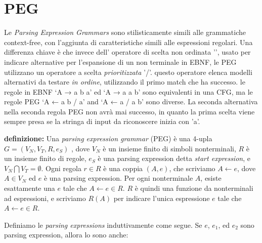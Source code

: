 \section{PEG} 
Le \textit{Parsing Expression Grammars}  \cite{brianford} sono stilisticamente simili alle grammatiche context-free, con l'aggiunta di  caratteristiche simili alle espressioni regolari. Una differenza chiave è che invece dell' operatore di scelta non ordinata '\textbar', usato per indicare alternative per l'espansione di un non terminale in EBNF, le PEG utilizzano un operatore a scelta \textit{prioritizzata} '/'. questo operatore elenca modelli alternativi da testare \textit{in ordine}, utilizzando il primo match che ha successo. le regole in EBNF ‘A → a b \textbar a’ ed ‘A → a \textbar a b’ sono equivalenti in una CFG, ma le regole PEG ‘A ← a b / a’ and ‘A ← a / a b’ sono diverse. La seconda alternativa nella seconda regola PEG non avrà mai successo, in quanto la prima scelta viene sempre presa se la stringa di input da riconoscere inizia con 'a'.

\textbf{definizione:} Una \textit{parsing expression grammar} (PEG) è una 4-upla $G = (V_N,V_T,R,e_S)$ , dove  $V_N$ è un insieme finito di simboli nonterminali, $R$ è un insieme finito di regole, $e_S$ è una parsing expression detta \textit{start expression}, e $V_N \bigcap V_T = \emptyset $. Ogni regola $r \in R$ è una coppia $(A,e)$, che scriviamo $A \leftarrow e$, dove $A \in V_N$ ed $e$ è una parsing expression. Per ogni nonterminale $A$, esiste esattamente una $e$ tale che $A \leftarrow e \in R$. $R$ è quindi una funzione da nonterminali ad espressioni, e scriviamo $R(A)$ per indicare l'unica espressione $e$ tale che $A \leftarrow e \in R$. 

Definiamo le \textit{parsing expressions} induttivamente come segue. Se $e$, $e_1$, ed $e_2$ sono parsing expression, allora lo sono anche:


